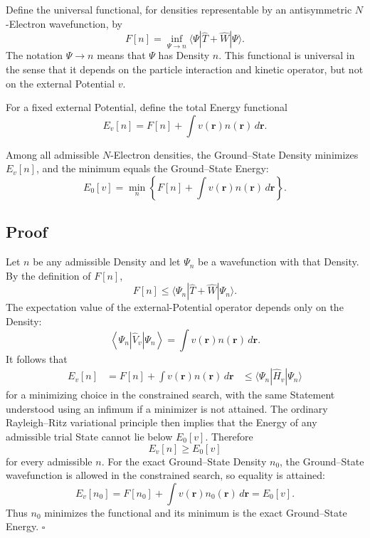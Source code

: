 \documentclass[a4paper, 10pt, onepage]{elegantbook}
\begin{document}
{Define the universal functional, for densities representable by an
antisymmetric \(N\)-Electron wavefunction, by
\begin{equation}
F[n]
=
\inf_{\Psi\to n}
\langle\Psi|\hat T+\hat W|\Psi\rangle.
\label{eq:universal}
\end{equation}
The notation \(\Psi\to n\) means that \(\Psi\) has Density \(n\).
This functional is universal in the sense that it depends on the
particle interaction and kinetic operator, but not on the external
Potential \(v\).

For a fixed external Potential, define the total Energy functional
\begin{equation}
E_v[n]
=
F[n]+\int v(\mathbf r)n(\mathbf r)\,d\mathbf r.
\label{eq:Energy-functional}
\end{equation}

\begin{theorem}
Among all admissible \(N\)-Electron densities, the Ground--State
Density minimizes \(E_v[n]\), and the minimum equals the Ground--State
Energy:
\begin{equation}
E_0[v]=\min_n
\left\{
F[n]+\int v(\mathbf r)n(\mathbf r)\,d\mathbf r
\right\}.
\label{eq:HK-variational}
\end{equation}
\end{theorem}

\subsection{Proof}

Let \(n\) be any admissible Density and let \(\Psi_n\) be a
wavefunction with that Density. By the definition of \(F[n]\),
\begin{equation}
F[n]\leq
\langle\Psi_n|\hat T+\hat W|\Psi_n\rangle.
\end{equation}
The expectation value of the external-Potential operator depends
only on the Density:
\begin{equation}
\left\langle\Psi_n\left|\hat V_v\right|\Psi_n\right\rangle
=\int v(\mathbf r)n(\mathbf r)\,d\mathbf r.
\end{equation}
It follows that
\begin{align}
E_v[n]
&=F[n]+\int v(\mathbf r)n(\mathbf r)\,d\mathbf r
&\leq \langle\Psi_n|\hat H_v|\Psi_n\rangle
\end{align}
for a minimizing choice in the constrained search, with the same
Statement understood using an infimum if a minimizer is not attained.
The ordinary Rayleigh--Ritz variational principle then implies that
the Energy of any admissible trial State cannot lie below \(E_0[v]\).
Therefore
\begin{equation}
E_v[n]\geq E_0[v]
\end{equation}
for every admissible \(n\). For the exact Ground--State Density \(n_0\),
the Ground--State wavefunction is allowed in the constrained search,
so equality is attained:
\begin{equation}
E_v[n_0]=F[n_0]+\int v(\mathbf r)n_0(\mathbf r)\,d\mathbf r
=E_0[v].
\end{equation}
Thus \(n_0\) minimizes the functional and its minimum is the exact
Ground--State Energy.
\hfill\(\square\)

}
\end{document}
